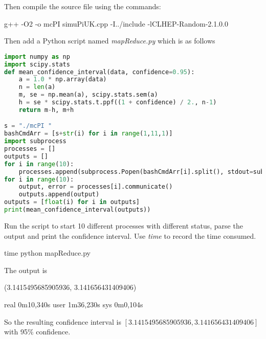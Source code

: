 \documentclass[a4paper, 12pt]{report}
\begin{document}
Then compile the source file using the commands:
\begin{commandshell}
    g++ -O2 -o mcPI simuPiUK.cpp -I../include -lCLHEP-Random-2.1.0.0
\end{commandshell}
Then add a Python script named \emph{mapReduce.py} which is as follows
\begin{lstlisting}[language=Python]
import numpy as np
import scipy.stats
def mean_confidence_interval(data, confidence=0.95):
    a = 1.0 * np.array(data)
    n = len(a)
    m, se = np.mean(a), scipy.stats.sem(a)
    h = se * scipy.stats.t.ppf((1 + confidence) / 2., n-1)
    return m-h, m+h

s = "./mcPI "
bashCmdArr = [s+str(i) for i in range(1,11,1)]
import subprocess
processes = []
outputs = []
for i in range(10):
    processes.append(subprocess.Popen(bashCmdArr[i].split(), stdout=subprocess.PIPE))
for i in range(10):
    output, error = processes[i].communicate()
    outputs.append(output)
outputs = [float(i) for i in outputs]
print(mean_confidence_interval(outputs))
\end{lstlisting}
Run the script to start 10 different processes with different status, parse the output and print the confidence interval. Use \emph{time} to record the time consumed.
\begin{commandshell}
    time python mapReduce.py
\end{commandshell}
The output is
\begin{messageshell}
(3.1415495685905936, 3.141656431409406)

real    0m10,340s
user    1m36,230s
sys     0m0,104s
\end{messageshell}

So the resulting confidence interval is $[3.1415495685905936, 3.141656431409406]$ with 95\% confidence.
\end{document}
